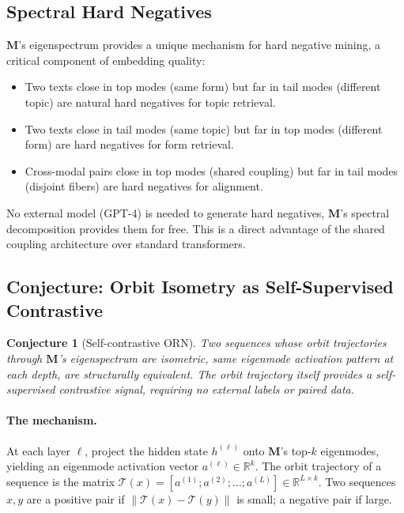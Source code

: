 \documentclass[11pt, a4paper]{article}
\newcommand{\M}{\mathbf{M}}
\newcommand{\R}{\mathbb{R}}
\theoremstyle{plain}
\newtheorem{conjecture}{Conjecture}
\theoremstyle{remark}
\begin{document}
\subsection{Spectral Hard Negatives}

$\M$'s eigenspectrum provides a unique mechanism for hard negative mining, a critical component of embedding quality:

\begin{itemize}[nosep]
    \item Two texts close in top modes (same form) but far in tail modes (different topic) are natural hard negatives for topic retrieval.
    \item Two texts close in tail modes (same topic) but far in top modes (different form) are hard negatives for form retrieval.
    \item Cross-modal pairs close in top modes (shared coupling) but far in tail modes (disjoint fibers) are hard negatives for alignment.
\end{itemize}

No external model (GPT-4) is needed to generate hard negatives, $\M$'s spectral decomposition provides them for free.
This is a direct advantage of the shared coupling architecture over standard transformers.

\subsection{Conjecture: Orbit Isometry as Self-Supervised Contrastive}
\label{sec:orbit-contrastive}

\begin{conjecture}[Self-contrastive ORN]
Two sequences whose orbit trajectories through $\M$'s eigenspectrum are isometric, same eigenmode activation pattern at each depth, are structurally equivalent.
The orbit trajectory itself provides a self-supervised contrastive signal, requiring no external labels or paired data.
\end{conjecture}

\paragraph{The mechanism.}
At each layer $\ell$, project the hidden state $h^{(\ell)}$ onto $\M$'s top-$k$ eigenmodes, yielding an eigenmode activation vector $a^{(\ell)} \in \R^k$.
The orbit trajectory of a sequence is the matrix $\mathcal{T}(x) = [a^{(1)}; a^{(2)}; \ldots; a^{(L)}] \in \R^{L \times k}$.
Two sequences $x, y$ are a positive pair if $\|\mathcal{T}(x) - \mathcal{T}(y)\|$ is small; a negative pair if large.
\end{document}
